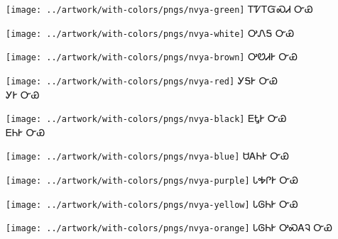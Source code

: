 \documentclass[avery5371]{flashcards}%
\begin{document}

\begin{flashcard}{
\texttt{[image: ../artwork/with-colors/pngs/nvya-green]}
}\Huge ᎢᏤᎢᏳᏍᏗ ᏅᏯ
\end{flashcard}

\begin{flashcard}{
\texttt{[image: ../artwork/with-colors/pngs/nvya-white]}
}\Huge ᎤᏁᎦ ᏅᏯ
\end{flashcard}

\begin{flashcard}{
\texttt{[image: ../artwork/with-colors/pngs/nvya-brown]}
}\Huge ᎤᏬᏗᎨ ᏅᏯ
\end{flashcard}

\begin{flashcard}{
\texttt{[image: ../artwork/with-colors/pngs/nvya-red]}
}\Huge ᎩᎦᎨ ᏅᏯ\\ᎩᎨ ᏅᏯ
\end{flashcard}

\begin{flashcard}{
\texttt{[image: ../artwork/with-colors/pngs/nvya-black]}
}\Huge ᎬᎿᎨ ᏅᏯ\\ᎬᏂᎨ ᏅᏯ
\end{flashcard}

\begin{flashcard}{
\texttt{[image: ../artwork/with-colors/pngs/nvya-blue]}
}\Huge ᏌᎪᏂᎨ ᏅᏯ
\end{flashcard}

\begin{flashcard}{
\texttt{[image: ../artwork/with-colors/pngs/nvya-purple]}
}\Huge ᏓᎭᎵᎨ ᏅᏯ
\end{flashcard}


\begin{flashcard}{
\texttt{[image: ../artwork/with-colors/pngs/nvya-yellow]}
}\Huge ᏓᎶᏂᎨ ᏅᏯ
\end{flashcard}

\begin{flashcard}{
\texttt{[image: ../artwork/with-colors/pngs/nvya-orange]}
}\Huge ᏓᎶᏂᎨ ᎤᏍᎪᎸ ᏅᏯ
\end{flashcard}
\end{document}
